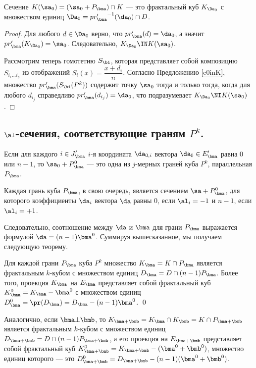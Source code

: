 \begin{proposition}\label{prop:2} 
Сечение $K(\sa_0)=(\sa_0+P_\bma)\cap K$ --- это фрактальный куб $K_{\Da_0}$ с множеством единиц $\Da_0={pr'_\bma}^{-1}(\da_0)\cap D$.
\end{proposition}

\begin{proof}
Для любого $d\in \Da_0$ верно, что $pr'_\bma(d)=\da_0$, а значит $pr'_\bma(K_{\Da_0})=\sa_0$.
Следовательно, $K_{\Da_0}\IN K(\sa_0)$.

Рассмотрим теперь гомотетию $S_\bi$, которая представляет собой композицию
$S_{i_1 \ldots i_p}$ из отображений $S_i(x)=\dfrac{x+d_i}{n}$.
Согласно Предложению \ref{c0inK}, множество $pr'_\bma(S_\bi(P^k))$ содержит точку $\sa_0$ тогда и только тогда, когда для любого $d_{i_j}$ справедливо $pr'_\bma(d_{i_j})=\da_0$, что подразумевает $K_{\Da_0}\NI K(\sa_0)$.
\end{proof}


\subsection{$\al$-сечения, соответствующие граням $P^k$.} 

Если для каждого $i\in J'_\bma$ $i$-я координата $\da_{0,i}$ вектора $\da_0\in E'_\bma$ равна $0$ или $n-1$, то $\sa_0+P^0_\bma$  --- это одна из $j$-мерных граней куба $P^k$, параллельная $P_{\bma}$.

Каждая грань куба $P_\bma$, в свою очередь, является сечением $\sa+P^0_\bma$, для которого коэффициенты $\da_{i}$ вектора $\da$ равны $0$, если $\al_i=-1$ и $n-1$, если $\al_i=+1$.

Следовательно, соотношение между $\da$ и $\bma$ для грани $P_\bma$ выражается формулой $\da=(n-1)\bma^ 0$.
Суммируя вышесказанное, мы получаем следующую теорему.

\begin{theorem}\label{bma0}
Для каждой грани $P_\bma$ куба $P^k$ множество $K_\bma=K\cap P_\bma$ является фрактальным $k$-кубом с множеством единиц $D_\bma=D\cap(n-1)P_\bma$.
Более того, проекция $K_\bma$ на $E_\bma$ представляет собой фрактальный куб $K_\bma^0=K_\bma-\bma^0$ с множеством единиц $D^0_\bma=\pr( D_\bma)= D_\bma-(n-1)\bma^0$.
\qed
\end{theorem}

Аналогично, если $\bma\bot\bmb$, то $K_ {\bma+\bmb}=K_\bma\cap K_\bmb=K\cap P_{\bma+\bmb}$ является фрактальным $k$-кубом с множеством единиц $D_{\bma+\bmb}=D\cap (n-1)P_{\bma+\bmb}$, а его проекция на $E_{\bma+\bmb}$ представляет собой фрактальный куб $K_ {\bma+\bmb}^0=K_{\bma+\bmb}-(\bma^0+\bmb^0)$, множество единиц которого --- это $D^0_{\bma+\bmb}= D_{\bma+\bmb}-(n-1)({\bma^0+\bmb^0})$.



